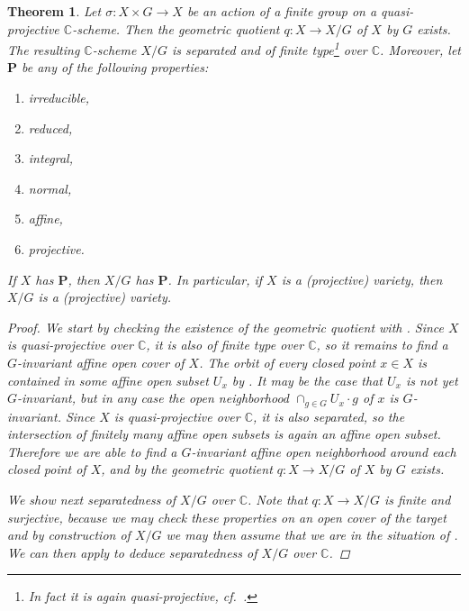 \documentclass[12pt,a4paper]{amsart}
\theoremstyle{plain}
\newtheorem{thm}{Theorem}[section]
\theoremstyle{definition}
\theoremstyle{remark}
\begin{document}
\begin{thm}\label{thm:quotient}
  Let $\sigma \colon X \times G \to X$ be an action of a finite group on a quasi-projective $\mathbb{C}$-scheme.
  Then the geometric quotient $q \colon X \to X/G$ of $X$ by $G$ exists.
  The resulting $\mathbb{C}$-scheme $X/G$ is separated and of finite type\footnote{In fact it is again quasi-projective, cf.~\cite[Proposition IV.1.5]{knu71}.} over $\mathbb{C}$.
  Moreover, let $\mathbf{P}$ be any of the following properties:
  \begin{enumerate}[label=(\alph*)]
    \item irreducible,
    \item reduced,
    \item integral,
    \item normal,
    \item affine,
    \item projective.
  \end{enumerate}
  If $X$ has $\mathbf{P}$, then $X/G$ has $\mathbf{P}$.
  In particular, if $X$ is a (projective) variety, then $X/G$ is a (projective) variety.

  \begin{proof}
    We start by checking the existence of the geometric quotient with .
    Since $X$ is quasi-projective over $\mathbb{C}$, it is also of finite type over $\mathbb{C}$, so it remains to find a $G$-invariant affine open cover of $X$.
    The orbit of every closed point $x \in X$ is contained in some affine open subset $U_{x}$ by .
    It may be the case that $U_{x}$ is not yet $G$-invariant, but in any case the open neighborhood $\cap_{g \in G} U_{x}\cdot g$ of $x$ is $G$-invariant.
    Since $X$ is quasi-projective over $\mathbb{C}$, it is also separated, so the intersection of finitely many affine open subsets is again an affine open subset.
    Therefore we are able to find a $G$-invariant affine open neighborhood around each closed point of $X$, and by  the geometric quotient $q \colon X \to X/G$ of $X$ by $G$ exists.

    We show next separatedness of $X/G$ over $\mathbb{C}$.
    Note that $q \colon X \to X/G$ is finite and surjective, because we may check these properties on an open cover of the target and by construction of $X/G$ we may then assume that we are in the situation of .
    We can then apply \cite[\href{https://stacks.math.columbia.edu/tag/09MQ}{Tag 09MQ}]{stacks-project} to deduce separatedness of $X/G$ over $\mathbb{C}$.


\end{proof}
\end{thm}
\end{document}
